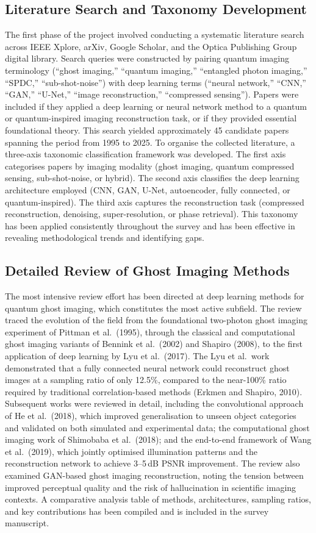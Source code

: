 \documentclass[12pt,a4paper]{article}
\begin{document}
\subsection{Literature Search and Taxonomy Development}
The first phase of the project involved conducting a systematic literature search across IEEE Xplore, arXiv, Google Scholar, and the Optica Publishing Group digital library. Search queries were constructed by pairing quantum imaging terminology (``ghost imaging,'' ``quantum imaging,'' ``entangled photon imaging,'' ``SPDC,'' ``sub-shot-noise'') with deep learning terms (``neural network,'' ``CNN,'' ``GAN,'' ``U-Net,'' ``image reconstruction,'' ``compressed sensing''). Papers were included if they applied a deep learning or neural network method to a quantum or quantum-inspired imaging reconstruction task, or if they provided essential foundational theory. This search yielded approximately 45 candidate papers spanning the period from 1995 to 2025.
To organise the collected literature, a three-axis taxonomic classification framework was developed. The first axis categorises papers by imaging modality (ghost imaging, quantum compressed sensing, sub-shot-noise, or hybrid). The second axis classifies the deep learning architecture employed (CNN, GAN, U-Net, autoencoder, fully connected, or quantum-inspired). The third axis captures the reconstruction task (compressed reconstruction, denoising, super-resolution, or phase retrieval). This taxonomy has been applied consistently throughout the survey and has been effective in revealing methodological trends and identifying gaps.
\subsection{Detailed Review of Ghost Imaging Methods}
The most intensive review effort has been directed at deep learning methods for quantum ghost imaging, which constitutes the most active subfield. The review traced the evolution of the field from the foundational two-photon ghost imaging experiment of Pittman et al.\ (1995), through the classical and computational ghost imaging variants of Bennink et al.\ (2002) and Shapiro (2008), to the first application of deep learning by Lyu et al.\ (2017). The Lyu et al.\ work demonstrated that a fully connected neural network could reconstruct ghost images at a sampling ratio of only 12.5\%, compared to the near-100\% ratio required by traditional correlation-based methods (Erkmen and Shapiro, 2010).
Subsequent works were reviewed in detail, including the convolutional approach of He et al.\ (2018), which improved generalisation to unseen object categories and validated on both simulated and experimental data; the computational ghost imaging work of Shimobaba et al.\ (2018); and the end-to-end framework of Wang et al.\ (2019), which jointly optimised illumination patterns and the reconstruction network to achieve 3--5\,dB PSNR improvement. The review also examined GAN-based ghost imaging reconstruction, noting the tension between improved perceptual quality and the risk of hallucination in scientific imaging contexts. A comparative analysis table of methods, architectures, sampling ratios, and key contributions has been compiled and is included in the survey manuscript.
\end{document}
